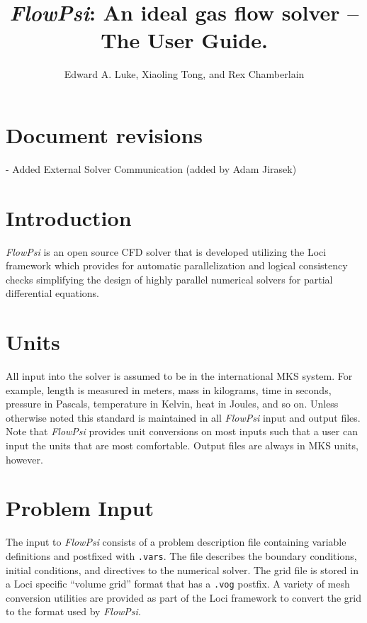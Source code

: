 \documentclass{article}
\begin{document}
\title{{\em FlowPsi}: An ideal gas flow solver -- The User Guide.}

\author{ Edward A. Luke, Xiaoling Tong, and Rex Chamberlain}

\maketitle

\section*{Document revisions}
- Added External Solver Communication (added by Adam Jirasek)

\newpage
\section{Introduction}

{\em FlowPsi } is an open source CFD solver that is developed
utilizing the Loci framework\cite{Luke.2005,Zhang.2009} which provides
for automatic parallelization and logical consistency checks
simplifying the design of highly parallel numerical solvers for
partial differential equations.
\newpage


\section{Units}

All input into the solver is assumed to be in the international MKS
system.  For example, length is measured in meters, mass in kilograms,
time in seconds, pressure in Pascals, temperature in Kelvin, heat in
Joules, and so on.  Unless otherwise noted this standard is maintained
in all {\em FlowPsi} input and output files.  Note that {\em FlowPsi}
provides unit conversions on most inputs such that a user can input
the units that are most comfortable.  Output files are always in MKS
units, however.
\newpage

\section{Problem Input}

The input to {\em FlowPsi} consists of a problem description file containing
variable definitions and postfixed with {\tt .vars}. The file
describes the boundary conditions, initial conditions, and directives
to the numerical solver. The grid file is stored in a Loci specific
``volume grid'' format that has a {\tt .vog} postfix.  A variety of
mesh conversion utilities are provided as part of the Loci framework
to convert the grid to the format used by {\em FlowPsi}.  
\end{document}
